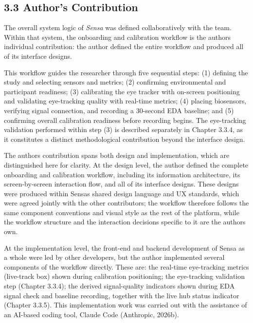 \documentclass[
]{article}
\begin{document}
\hypertarget{authors-contribution}{%
\subsection{\texorpdfstring{3.3 Author's Contribution }{3.3 Author's Contribution }}\label{authors-contribution}}

The overall system logic of \emph{Sensa} was defined collaboratively with the team. Within that system, the onboarding and calibration workflow is the author\textquotesingle s individual contribution: the author defined the entire workflow and produced all of its interface designs.

This workflow guides the researcher through five sequential steps: (1) defining the study and selecting sensors and metrics; (2) confirming environmental and participant readiness; (3) calibrating the eye tracker with on-screen positioning and validating eye-tracking quality with real-time metrics; (4) placing biosensors, verifying signal connection, and recording a 30-second EDA baseline; and (5) confirming overall calibration readiness before recording begins. The eye-tracking validation performed within step (3) is described separately in Chapter 3.3.4, as it constitutes a distinct methodological contribution beyond the interface design.

The author\textquotesingle s contribution spans both design and implementation, which are distinguished here for clarity. At the design level, the author defined the complete onboarding and calibration workflow, including its information architecture, its screen-by-screen interaction flow, and all of its interface designs. These designs were produced within Sensa\textquotesingle s shared design language and UX standards, which were agreed jointly with the other contributors; the workflow therefore follows the same component conventions and visual style as the rest of the platform, while the workflow structure and the interaction decisions specific to it are the author\textquotesingle s own.

At the implementation level, the front-end and backend development of Sensa as a whole were led by other developers, but the author implemented several components of the workflow directly. These are: the real-time eye-tracking metrics (live-track box) shown during calibration positioning; the eye-tracking validation step (Chapter 3.3.4); the derived signal-quality indicators shown during EDA signal check and baseline recording, together with the live hub status indicator (Chapter 3.3.5). This implementation work was carried out with the assistance of an AI-based coding tool, Claude Code (Anthropic, 2026b).
\end{document}
